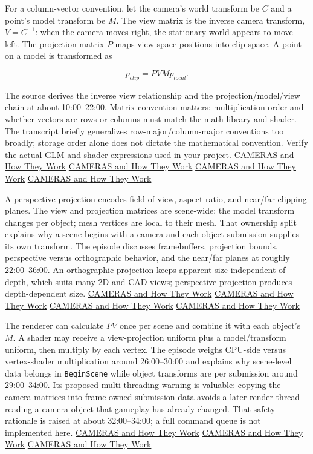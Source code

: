 For a column-vector convention, let the camera's world transform be \(C\) and a point's model transform be \(M\). The view matrix is the inverse camera transform, \(V=C^{-1}\): when the camera moves right, the stationary world appears to move left. The projection matrix \(P\) maps view-space positions into clip space. A point on a model is transformed as

\[p_{clip}=PVMp_{local}.\]

The source derives the inverse view relationship and the projection/model/view chain at about 10:00--22:00. Matrix convention matters: multiplication order and whether vectors are rows or columns must match the math library and shader. The transcript briefly generalizes row-major/column-major conventions too broadly; storage order alone does not dictate the mathematical convention. Verify the actual GLM and shader expressions used in your project. \href{https://www.youtube.com/watch?v=LfbqtmqxX04&t=600s}{CAMERAS and How They Work} \href{https://www.youtube.com/watch?v=LfbqtmqxX04&t=960s}{CAMERAS and How They Work} \href{https://www.youtube.com/watch?v=LfbqtmqxX04&t=1140s}{CAMERAS and How They Work} \href{https://www.youtube.com/watch?v=LfbqtmqxX04&t=1320s}{CAMERAS and How They Work}

A perspective projection encodes field of view, aspect ratio, and near/far clipping planes. The view and projection matrices are scene-wide; the model transform changes per object; mesh vertices are local to their mesh. That ownership split explains why a scene begins with a camera and each object submission supplies its own transform. The episode discusses framebuffers, projection bounds, perspective versus orthographic behavior, and the near/far planes at roughly 22:00--36:00. An orthographic projection keeps apparent size independent of depth, which suits many 2D and CAD views; perspective projection produces depth-dependent size. \href{https://www.youtube.com/watch?v=LfbqtmqxX04&t=1320s}{CAMERAS and How They Work} \href{https://www.youtube.com/watch?v=LfbqtmqxX04&t=1560s}{CAMERAS and How They Work} \href{https://www.youtube.com/watch?v=LfbqtmqxX04&t=1800s}{CAMERAS and How They Work} \href{https://www.youtube.com/watch?v=LfbqtmqxX04&t=2100s}{CAMERAS and How They Work}

The renderer can calculate \(PV\) once per scene and combine it with each object's \(M\). A shader may receive a view-projection uniform plus a model/transform uniform, then multiply by each vertex. The episode weighs CPU-side versus vertex-shader multiplication around 26:00--30:00 and explains why scene-level data belongs in \texttt{BeginScene} while object transforms are per submission around 29:00--34:00. Its proposed multi-threading warning is valuable: copying the camera matrices into frame-owned submission data avoids a later render thread reading a camera object that gameplay has already changed. That safety rationale is raised at about 32:00--34:00; a full command queue is not implemented here. \href{https://www.youtube.com/watch?v=LfbqtmqxX04&t=1560s}{CAMERAS and How They Work} \href{https://www.youtube.com/watch?v=LfbqtmqxX04&t=1740s}{CAMERAS and How They Work} \href{https://www.youtube.com/watch?v=LfbqtmqxX04&t=1920s}{CAMERAS and How They Work}

